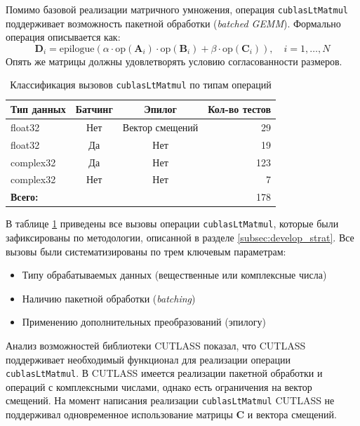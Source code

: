 Помимо базовой реализации матричного умножения, операция \texttt{cublasLtMatmul} поддерживает возможность пакетной обработки
(\textit{batched GEMM}). Формально операция описывается как:
\begin{equation}
\mathbf{D}_i = \text{epilogue}\left(\alpha \cdot \text{op}(\mathbf{A}_i) \cdot \text{op}(\mathbf{B}_i) + \beta \cdot \text{op}(\mathbf{C}_i)\right), \quad i = 1,\ldots,N
\end{equation}
Опять же матрицы должны удовлетворять условию согласованности размеров.

\begin{table}[h]
\centering
\begin{tabular}{|l|c|c|r|}
\hline
\multicolumn{1}{|c|}{\textbf{Тип данных}} & \textbf{Батчинг} & \textbf{Эпилог} & \textbf{Кол-во тестов} \\ \hline
float32 & Нет & Вектор смещений & 29 \\ \hline
float32 & Да & Нет & 19 \\ \hline
complex32 & Да & Нет & 123 \\ \hline
complex32 & Нет & Нет & 7 \\ \hline
\hline
\multicolumn{3}{|l|}{\textbf{Всего:}} & 178 \\ \hline
\end{tabular}
\caption{Классификация вызовов \texttt{cublasLtMatmul} по типам операций}
\label{tbl:cublas_calls}
\end{table}

В таблице \ref{tbl:cublas_calls} приведены все вызовы операции \texttt{cublasLtMatmul}, которые были зафиксированы по методологии,
описанной в разделе \ref{subsec:develop_strat}. Все вызовы были систематизированы по трем ключевым параметрам:
\begin{itemize}
\item Типу обрабатываемых данных (вещественные или комплексные числа)
\item Наличию пакетной обработки (\textit{batching})
\item Применению дополнительных преобразований (эпилогу)
\end{itemize}

Анализ возможностей библиотеки CUTLASS показал, что CUTLASS поддерживает необходимый функционал для
реализации операции \texttt{cublasLtMatmul}. В CUTLASS имеется реализации пакетной обработки и операций
с комплексными числами, однако есть ограничения на вектор смещений. На момент написания реализации \texttt{cublasLtMatmul}
CUTLASS не поддерживал одновременное использование матрицы $\mathbf{C}$ и вектора смещений.

